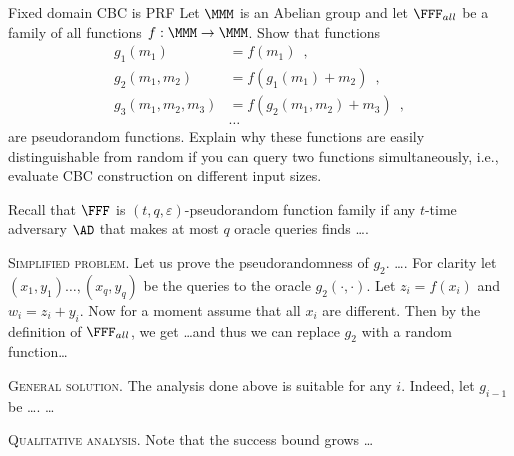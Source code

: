 \documentclass{crypto-exercise}
\author{Sven Laur}
\begin{document}
\begin{exercise}{Fixed domain CBC is PRF}
Let $\MMM$ is an Abelian group and let $\FFF_{all}$ be a family of all functions $f:\MMM\to\MMM$.
Show that functions 
\begin{align*}
g_1(m_1) &= f(m_1)\enspace,\\
g_2(m_1,m_2)&=f(g_1(m_1)+m_2)\enspace,\\
g_3(m_1,m_2,m_3)&=f(g_2(m_1,m_2)+m_3)\enspace, \\
&\ldots
\end{align*}
are pseudorandom functions. Explain why these functions are easily distinguishable from random if you can query two functions simultaneously, i.e., evaluate CBC construction on different input sizes.
\end{exercise}

\begin{solution}
Recall that $\FFF$ is $(t,q,\varepsilon)$-pseudorandom function family if any $t$-time adversary $\AD$ that makes at most $q$ oracle queries finds \ldots.

\vspace*{2ex}
\noindent
\textsc{Simplified problem.}
Let us prove the pseudorandomness of $g_2$. \ldots. 
For clarity let $(x_1,y_1)\ldots, (x_q, y_q)$ be the queries to the oracle $g_2(\cdot,\cdot)$.
Let $z_i=f(x_i)$ and $w_i=z_i+y_i$.
Now for a moment assume that all $x_i$ are different. 
Then by the definition of $\FFF_{all}$, we get \ldots  and thus we can replace $g_2$ with a random function\ldots


\vspace*{2ex}
\noindent
\textsc{General solution.}
The analysis done above is suitable for any $i$. Indeed, let $g_{i-1}$ be \ldots. 
 \ldots


\vspace*{2ex}
\noindent
\textsc{Qualitative analysis.} Note that the success bound grows \ldots 








\end{solution}
\end{document}
